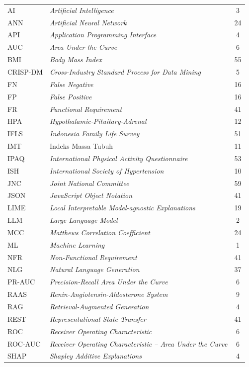 \begin{longtable}{@{} l >{\raggedright\arraybackslash}p{7.5cm} c @{}}
AI & \textit{Artificial Intelligence} & 3 \\
ANN & \textit{Artificial Neural Network} & 24 \\
API & \textit{Application Programming Interface} & 4 \\
AUC & \textit{Area Under the Curve} & 6 \\
BMI & \textit{Body Mass Index} & 55 \\
CRISP-DM & \textit{Cross-Industry Standard Process for Data Mining} & 5 \\
FN & \textit{False Negative} & 16 \\
FP & \textit{False Positive} & 16 \\
FR & \textit{Functional Requirement} & 41 \\
HPA & \textit{Hypothalamic-Pituitary-Adrenal} & 12 \\
IFLS & \textit{Indonesia Family Life Survey} & 51 \\
IMT & Indeks Massa Tubuh & 11 \\
IPAQ & \textit{International Physical Activity Questionnaire} & 53 \\
ISH & \textit{International Society of Hypertension} & 10 \\
JNC & \textit{Joint National Committee} & 59 \\
JSON & \textit{JavaScript Object Notation} & 41 \\
LIME & \textit{Local Interpretable Model-agnostic Explanations} & 19 \\
LLM & \textit{Large Language Model} & 2 \\
MCC & \textit{Matthews Correlation Coefficient} & 24 \\
ML & \textit{Machine Learning} & 1 \\
NFR & \textit{Non-Functional Requirement} & 41 \\
NLG & \textit{Natural Language Generation} & 37 \\
PR-AUC & \textit{Precision-Recall Area Under the Curve} & 6 \\
RAAS & \textit{Renin-Angiotensin-Aldosterone System} & 9 \\
RAG & \textit{Retrieval-Augmented Generation} & 4 \\
REST & \textit{Representational State Transfer} & 41 \\
ROC & \textit{Receiver Operating Characteristic} & 6 \\
ROC-AUC & \textit{Receiver Operating Characteristic -- Area Under the Curve} & 6 \\
SHAP & \textit{Shapley Additive Explanations} & 4 \\

\end{longtable}
